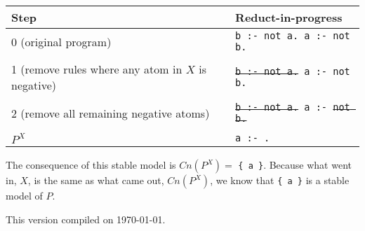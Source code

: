 \documentclass[10pt,a4paper,landscape]{article}
\begin{document}
\begin{center}
	\begin{tabular}{p{5cm}p{5cm}}
	Step & Reduct-in-progress \\ \midrule
	
	0 (original program)	& \texttt{b :- not a. \newline a :- not b.} \\&\\
	
	1 (remove rules where any atom in $X$ is negative) & \texttt{\sout{b :- not a.} \newline a :- not b.} \\&\\
	
	2 (remove all remaining negative atoms)	& \texttt{\sout{b :- not a.} \newline a :- \sout{not b.}} \\&\\
	
	$P^X$ & \texttt{a :- .}
\end{tabular}
\end{center}

\noindent The consequence of this stable model is $Cn(P^X) =$ \texttt{\{ a \}}.
Because what went in, $X$, is the same as what came out, $Cn(P^X)$, we know that \texttt{\{ a \}} is a stable model of $P$.


\vfill \hfill This version compiled on \today.
	
\end{document}
